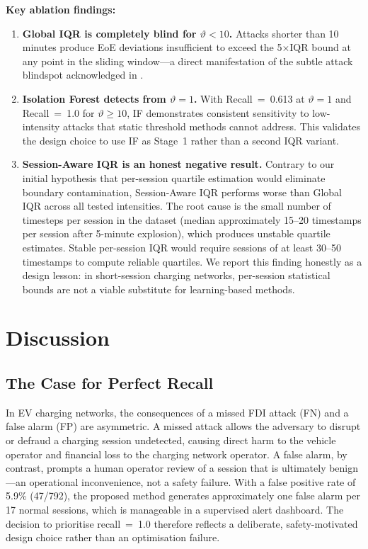 \documentclass[journal]{IEEEtran}
\begin{document}
\textbf{Key ablation findings:}
\begin{enumerate}
\item \textbf{Global IQR is completely blind for $\vartheta < 10$.}
Attacks shorter than 10 minutes produce EoE deviations insufficient to
exceed the 5$\times$IQR bound at any point in the sliding window---a
direct manifestation of the subtle attack blindspot acknowledged in
\cite{basumatary2025}.

\item \textbf{Isolation Forest detects from $\vartheta = 1$.}
With Recall~=~0.613 at $\vartheta=1$ and Recall~=~1.0 for
$\vartheta \geq 10$, IF demonstrates consistent sensitivity to
low-intensity attacks that static threshold methods cannot address.
This validates the design choice to use IF as Stage~1 rather than a
second IQR variant.

\item \textbf{Session-Aware IQR is an honest negative result.}
Contrary to our initial hypothesis that per-session quartile estimation
would eliminate boundary contamination, Session-Aware IQR performs
worse than Global IQR across all tested intensities. The root cause
is the small number of timesteps per session in the dataset (median
approximately 15--20 timestamps per session after 5-minute explosion),
which produces unstable quartile estimates. Stable per-session IQR
would require sessions of at least 30--50 timestamps to compute
reliable quartiles. We report this finding honestly as a design
lesson: in short-session charging networks, per-session statistical
bounds are not a viable substitute for learning-based methods.
\end{enumerate}

\section{Discussion}
\label{sec:discussion}

\subsection{The Case for Perfect Recall}
In EV charging networks, the consequences of a missed FDI attack (FN)
and a false alarm (FP) are asymmetric. A missed attack allows the
adversary to disrupt or defraud a charging session undetected, causing
direct harm to the vehicle operator and financial loss to the charging
network operator. A false alarm, by contrast, prompts a human operator
review of a session that is ultimately benign---an operational
inconvenience, not a safety failure. With a false positive rate of
5.9\% (47/792), the proposed method generates approximately one false
alarm per 17 normal sessions, which is manageable in a supervised
alert dashboard. The decision to prioritise recall~=~1.0 therefore
reflects a deliberate, safety-motivated design choice rather than an
optimisation failure.
\end{document}
